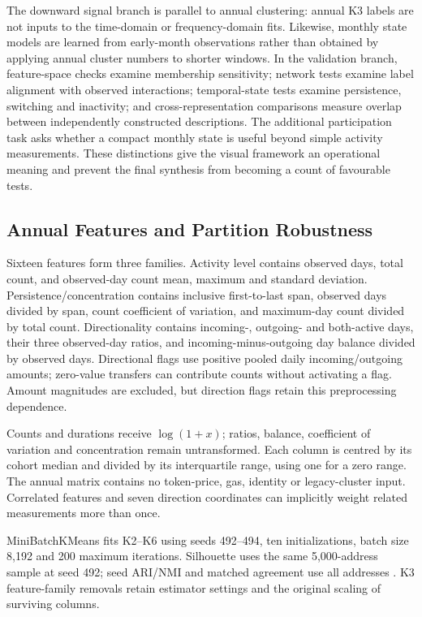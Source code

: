 \documentclass[journal,letterpaper]{IEEEtran}
\begin{document}
The downward signal branch is parallel to annual clustering: annual K3 labels are not inputs to the time-domain or frequency-domain fits. Likewise, monthly state models are learned from early-month observations rather than obtained by applying annual cluster numbers to shorter windows. In the validation branch, feature-space checks examine membership sensitivity; network tests examine label alignment with observed interactions; temporal-state tests examine persistence, switching and inactivity; and cross-representation comparisons measure overlap between independently constructed descriptions. The additional participation task asks whether a compact monthly state is useful beyond simple activity measurements. These distinctions give the visual framework an operational meaning and prevent the final synthesis from becoming a count of favourable tests.

\subsection{Annual Features and Partition Robustness}
Sixteen features form three families. Activity level contains observed days, total count, and observed-day count mean, maximum and standard deviation. Persistence/concentration contains inclusive first-to-last span, observed days divided by span, count coefficient of variation, and maximum-day count divided by total count. Directionality contains incoming-, outgoing- and both-active days, their three observed-day ratios, and incoming-minus-outgoing day balance divided by observed days. Directional flags use positive pooled daily incoming/outgoing amounts; zero-value transfers can contribute counts without activating a flag. Amount magnitudes are excluded, but direction flags retain this preprocessing dependence.

Counts and durations receive $\log(1+x)$; ratios, balance, coefficient of variation and concentration remain untransformed. Each column is centred by its cohort median and divided by its interquartile range, using one for a zero range. The annual matrix contains no token-price, gas, identity or legacy-cluster input. Correlated features and seven direction coordinates can implicitly weight related measurements more than once.

MiniBatchKMeans fits K2--K6 using seeds 492--494, ten initializations, batch size 8,192 and 200 maximum iterations. Silhouette uses the same 5,000-address sample at seed 492; seed ARI/NMI and matched agreement use all addresses \cite{hubert1985partitions,vinh2010information,kuhn1955hungarian,rousseeuw1987silhouettes}. K3 feature-family removals retain estimator settings and the original scaling of surviving columns.
\end{document}
